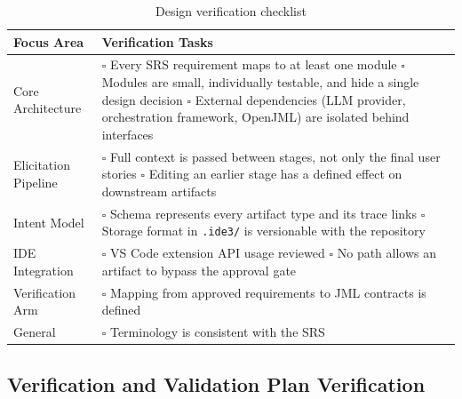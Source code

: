 \documentclass[12pt, titlepage]{article}
\begin{document}
\begin{table}[H]
\centering
\renewcommand{\arraystretch}{1.3}
\begin{tabularx}{\textwidth}{|>{\raggedright\arraybackslash}p{3.5cm}|>{\raggedright\arraybackslash}X|}
\hline
\textbf{Focus Area} & \textbf{Verification Tasks} \\
\hline
Core Architecture &
$\square$ Every SRS requirement maps to at least one module \newline
$\square$ Modules are small, individually testable, and hide a single
design decision \newline
$\square$ External dependencies (LLM provider, orchestration framework,
OpenJML) are isolated behind interfaces \\
\hline
Elicitation Pipeline &
$\square$ Full context is passed between stages, not only the final user
stories \newline
$\square$ Editing an earlier stage has a defined effect on downstream
artifacts \\
\hline
Intent Model &
$\square$ Schema represents every artifact type and its trace links
\newline
$\square$ Storage format in \texttt{.ide3/} is versionable with the
repository \\
\hline
IDE Integration &
$\square$ VS Code extension API usage reviewed \newline
$\square$ No path allows an artifact to bypass the approval gate \\
\hline
Verification Arm &
$\square$ Mapping from approved requirements to JML contracts is
defined \\
\hline
General &
$\square$ Terminology is consistent with the SRS \\
\hline
\end{tabularx}
\caption{Design verification checklist}
\label{tab:design-checklist}
\end{table}

\subsection{Verification and Validation Plan Verification}



\end{document}
